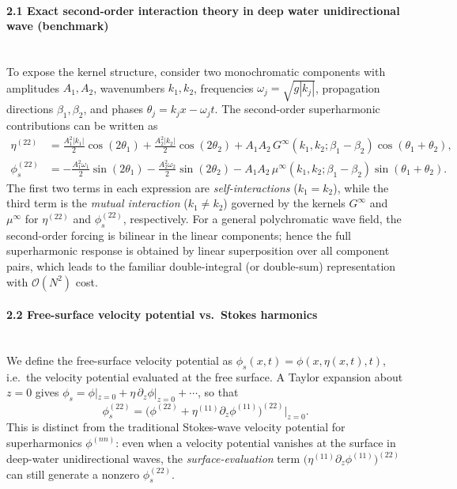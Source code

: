 \documentclass[11pt,letter]{article}
\begin{document}
\paragraph{2.1 Exact second-order interaction theory in deep water unidirectional wave (benchmark)}$\quad$\\
To expose the kernel structure, consider two monochromatic components with amplitudes $A_1,A_2$, wavenumbers $k_1,k_2$, frequencies $\omega_j=\sqrt{g|k_j|}$, propagation directions $\beta_1,\beta_2$, and phases $\theta_j=k_jx-\omega_j t$. The second-order superharmonic contributions can be written as \cite{dalzell_note_1999,madsen_third-order_2012}
\begin{align}
\eta^{(22)} &= \frac{A_1^2|k_1|}{2}\cos(2\theta_1) + \frac{A_2^2|k_2|}{2}\cos(2\theta_2)
            + A_1A_2\,G^\infty(k_1,k_2;\beta_1-\beta_2)\cos(\theta_1+\theta_2), \label{eq:eta22_two_comp}\\
\phi_s^{(22)} &= -\frac{A_1^2\omega_1}{2}\sin(2\theta_1) - \frac{A_2^2\omega_2}{2}\sin(2\theta_2)
            - A_1A_2\,\mu^\infty(k_1,k_2;\beta_1-\beta_2)\sin(\theta_1+\theta_2). \label{eq:phis22_two_comp}
\end{align}
The first two terms in each expression are \emph{self-interactions} ($k_1=k_2$), while the third term is the \emph{mutual interaction} ($k_1\neq k_2$) governed by the kernels $G^\infty$ and $\mu^\infty$ for $\eta^{(22)}$ and $\phi_s^{(22)}$, respectively. For a general polychromatic wave field, the second-order forcing is bilinear in the linear components; hence the full superharmonic response is obtained by linear superposition over all component pairs, which leads to the familiar double-integral (or double-sum) representation with $\mathcal{O}(N^2)$ cost.

\paragraph{2.2 Free-surface velocity potential vs.\ Stokes harmonics}$\quad$\\
We define the free-surface velocity potential as $\phi_s(x,t)=\phi(x,\eta(x,t),t)$, i.e.\ the velocity potential evaluated at the free surface. A Taylor expansion about $z=0$ gives
$\phi_s=\phi|_{z=0}+\eta\,\partial_z\phi|_{z=0}+\cdots$,
so that
\begin{equation}\label{eq:phis22_def}
\phi_s^{(22)}=\Big(\phi^{(22)}+\eta^{(11)}\partial_z\phi^{(11)}\Big)^{(22)}\Big|_{z=0}.
\end{equation}
This is distinct from the traditional Stokes-wave velocity potential for superharmonics $\phi^{(nn)}$: even when a velocity potential vanishes at the surface in deep-water unidirectional waves, the \emph{surface-evaluation} term $\big(\eta^{(11)}\partial_z\phi^{(11)}\big)^{(22)}$ can still generate a nonzero $\phi_s^{(22)}$.
\end{document}
